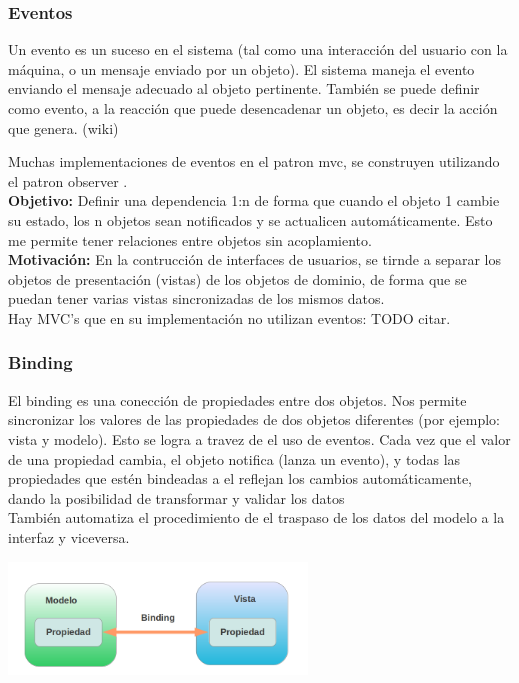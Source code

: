 \subsubsection{Eventos}

Un evento es un suceso en el sistema (tal como una interacción del usuario con
la máquina, o un mensaje enviado por un objeto).  
El sistema maneja el evento enviando el mensaje adecuado al objeto pertinente. 
También se puede definir como evento, a la reacción que puede desencadenar un objeto,  es decir la acción
que genera. (wiki)

Muchas implementaciones de eventos en el patron mvc, se construyen utilizando el
patron observer \cite{Gamma1995}.\\

{\bf Objetivo:} Definir una dependencia 1:n de forma que cuando el objeto 1
	cambie su estado, los n objetos sean notificados y se actualicen
	automáticamente. Esto me permite tener relaciones entre objetos sin
	acoplamiento.\\

{\bf Motivación:} En la contrucción de interfaces de usuarios, se tirnde
a separar los objetos de presentación (vistas) de los objetos de dominio, de
forma que se puedan tener varias vistas sincronizadas de los mismos datos.\\


Hay MVC's que en su implementación no utilizan eventos: TODO citar.


\subsubsection{Binding}
El binding es una conección de propiedades entre dos objetos. 
Nos permite sincronizar los valores de las propiedades de dos objetos diferentes
(por ejemplo: vista y modelo). Esto se logra a travez de el uso de eventos.
Cada vez que el valor de una propiedad cambia, el objeto notifica (lanza un
evento), y todas las propiedades que estén bindeadas a el reflejan los cambios automáticamente, 
dando la posibilidad de transformar y validar los datos\\
También automatiza el procedimiento de el traspaso de los datos del
modelo a la interfaz y viceversa.


\includegraphics[width=300px]{img/binding}

